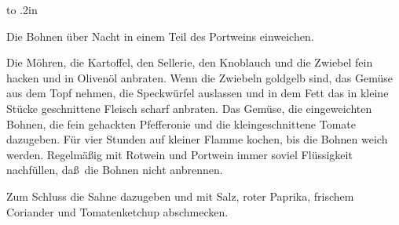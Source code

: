 \documentclass[11pt,twocolumn,a4paper]{article}
\begin{document}
\leavevmode\vbox to .2in{\vss}

Die Bohnen \"uber Nacht in einem Teil des Portweins einweichen.

Die M\"ohren, die Kartoffel, den Sellerie, den Knoblauch und die Zwiebel
fein hacken und in Oliven\"ol anbraten. Wenn die Zwiebeln goldgelb sind,
das Gem\"use aus dem Topf nehmen, die Speckw\"urfel auslassen und in dem
Fett das in kleine St\"ucke geschnittene Fleisch scharf anbraten. Das
Gem\"use, die eingeweichten Bohnen, die fein gehackten Pfefferonie und
die kleingeschnittene Tomate dazugeben. F\"ur vier Stunden auf kleiner
Flamme kochen, bis die Bohnen weich werden. Regelm\"a\ss ig mit Rotwein und
Portwein immer soviel Fl\"ussigkeit nachf\"ullen, da\ss\ die Bohnen nicht
anbrennen.

Zum Schluss die Sahne dazugeben und mit Salz, roter Paprika, frischem
Coriander und Tomatenketchup abschmecken.
\end{document}
